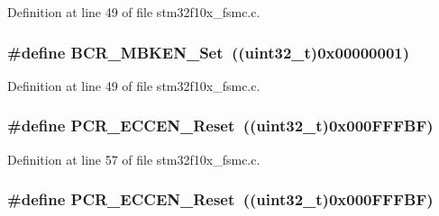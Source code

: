 Definition at line 49 of file stm32f10x\+\_\+fsmc.\+c.

\subsubsection[{\texorpdfstring{B\+C\+R\+\_\+\+M\+B\+K\+E\+N\+\_\+\+Set}{BCR_MBKEN_Set}}]{\setlength{\rightskip}{0pt plus 5cm}\#define B\+C\+R\+\_\+\+M\+B\+K\+E\+N\+\_\+\+Set~(({\bf uint32\+\_\+t})0x00000001)}\hypertarget{group___f_s_m_c___private___defines_ga3c427afcf32b17fb72be67fd4638e6d5}{}\label{group___f_s_m_c___private___defines_ga3c427afcf32b17fb72be67fd4638e6d5}


Definition at line 49 of file stm32f10x\+\_\+fsmc.\+c.

\subsubsection[{\texorpdfstring{P\+C\+R\+\_\+\+E\+C\+C\+E\+N\+\_\+\+Reset}{PCR_ECCEN_Reset}}]{\setlength{\rightskip}{0pt plus 5cm}\#define P\+C\+R\+\_\+\+E\+C\+C\+E\+N\+\_\+\+Reset~(({\bf uint32\+\_\+t})0x000\+F\+F\+F\+B\+F)}\hypertarget{group___f_s_m_c___private___defines_gaca1a5c5cd46c8a32dab58c3eb3b865fa}{}\label{group___f_s_m_c___private___defines_gaca1a5c5cd46c8a32dab58c3eb3b865fa}


Definition at line 57 of file stm32f10x\+\_\+fsmc.\+c.

\subsubsection[{\texorpdfstring{P\+C\+R\+\_\+\+E\+C\+C\+E\+N\+\_\+\+Reset}{PCR_ECCEN_Reset}}]{\setlength{\rightskip}{0pt plus 5cm}\#define P\+C\+R\+\_\+\+E\+C\+C\+E\+N\+\_\+\+Reset~(({\bf uint32\+\_\+t})0x000\+F\+F\+F\+B\+F)}\hypertarget{group___f_s_m_c___private___defines_gaca1a5c5cd46c8a32dab58c3eb3b865fa}{}\label{group___f_s_m_c___private___defines_gaca1a5c5cd46c8a32dab58c3eb3b865fa}



